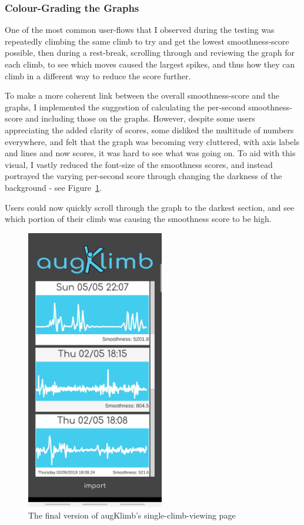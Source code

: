 \subsubsection{Colour-Grading the Graphs}
One of the most common user-flows that I observed during the testing was repeatedly climbing the same climb to try and get the lowest smoothness-score possible, then during a rest-break, scrolling through and reviewing the graph for each climb, to see which moves caused the largest spikes, and thus how they can climb in a different way to reduce the score further.

To make a more coherent link between the overall smoothness-score and the graphs, I implemented the suggestion of calculating the per-second smoothness-score and including those on the graphs.
However, despite some users appreciating the added clarity of scores, some disliked the multitude of numbers everywhere, and felt that the graph was becoming very cluttered, with axis labels and lines and now scores, it was hard to see what was going on.
To aid with this visual, I vastly reduced the font-size of the smoothness scores, 
and instead portrayed the varying per-second score through changing the darkness of the background - see Figure~\ref{fig:finalclimbview}.

Users could now quickly scroll through the graph to the darkest section, and see which portion of their climb was causing the smoothness score to be high.


\begin{figure}[h]
\centering
\includegraphics[width=6cm]{imgs/finalclimbview}
\caption{The final version of augKlimb's single-climb-viewing page}
\label{fig:finalclimbview}
\end{figure}




